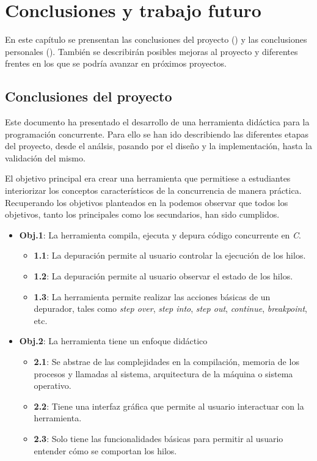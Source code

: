 \chapter{Conclusiones y trabajo futuro}\label{chap:conclusiones}
En este capítulo se prensentan las conclusiones del proyecto () y las conclusiones personales (). También se describirán posibles mejoras al proyecto y diferentes frentes en los que se podría avanzar en próximos proyectos.

\section{Conclusiones del proyecto}\label{sec:conclusiones_proyecto}

Este documento ha presentado el desarrollo de una herramienta didáctica para la programación concurrente. Para ello se han ido describiendo las diferentes etapas del proyecto, desde el análsis, pasando por el diseño y la implementación, hasta la validación del mismo.

El objetivo principal era crear una herramienta que permitiese a estudiantes interiorizar los conceptos característicos de la concurrencia de manera práctica. Recuperando los objetivos planteados en la  podemos observar que todos los objetivos, tanto los principales como los secundarios, han sido cumplidos.

\begin{itemize}
    \item \textbf{Obj.1}: La herramienta compila, ejecuta y depura código concurrente en \textit{C}.
    \begin{itemize}
        \item \textbf{1.1}: La depuración permite al usuario controlar la ejecución de los hilos.
        \item \textbf{1.2}: La depuración permite al usuario observar el estado de los hilos.
        \item \textbf{1.3}: La herramienta permite realizar las acciones básicas de un depurador, tales como \textit{step over}, \textit{step into}, \textit{step out}, \textit{continue}, \textit{breakpoint}, etc.
    \end{itemize}
    
    \item \textbf{Obj.2}: La herramienta tiene un enfoque didáctico\label{obj:didactico}
    \begin{itemize}
        \item \textbf{2.1}: Se abstrae de las complejidades en la compilación, memoria de los procesos y llamadas al sistema, arquitectura de la máquina o sistema operativo.
        \item \textbf{2.2}: Tiene una interfaz gráfica que permite al usuario interactuar con la herramienta.
        \item \textbf{2.3}: Solo tiene las funcionalidades básicas para permitir al usuario entender cómo se comportan los hilos.
    \end{itemize}
\end{itemize}

